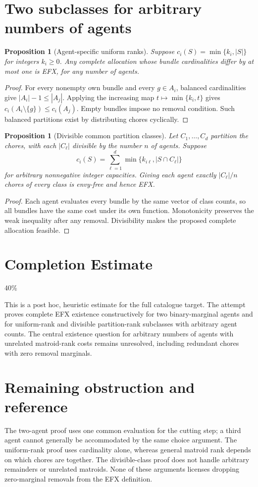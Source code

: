 \documentclass[11pt,a4paper]{article}
\newtheorem{proposition}[theorem]{Proposition}
\theoremstyle{definition}
\theoremstyle{remark}
\begin{document}
\section{Two subclasses for arbitrary numbers of agents}
\begin{proposition}[Agent-specific uniform ranks]
Suppose $c_i(S)=\min\{k_i,|S|\}$ for integers $k_i\geq0$. Any complete allocation whose bundle cardinalities differ by at most one is EFX, for any number of agents.
\end{proposition}
\begin{proof}
For every nonempty own bundle and every $g\in A_i$, balanced cardinalities give $|A_i|-1\leq|A_j|$. Applying the increasing map $t\mapsto\min\{k_i,t\}$ gives $c_i(A_i\setminus\{g\})\leq c_i(A_j)$. Empty bundles impose no removal condition. Such balanced partitions exist by distributing chores cyclically.
\end{proof}

\begin{proposition}[Divisible common partition classes]
Let $C_1,\ldots,C_d$ partition the chores, with each $|C_\ell|$ divisible by the number $n$ of agents. Suppose
\[
 c_i(S)=\sum_{\ell=1}^d\min\{k_{i\ell},|S\cap C_\ell|\}
\]
for arbitrary nonnegative integer capacities. Giving each agent exactly $|C_\ell|/n$ chores of every class is envy-free and hence EFX.
\end{proposition}
\begin{proof}
Each agent evaluates every bundle by the same vector of class counts, so all bundles have the same cost under its own function. Monotonicity preserves the weak inequality after any removal. Divisibility makes the proposed complete allocation feasible.
\end{proof}

\section{Completion Estimate}
40\%

This is a post hoc, heuristic estimate for the full catalogue target.
The attempt proves complete EFX existence constructively for two binary-marginal agents and for uniform-rank and divisible partition-rank subclasses with arbitrary agent counts. The central existence question for arbitrary numbers of agents with unrelated matroid-rank costs remains unresolved, including redundant chores with zero removal marginals.

\section{Remaining obstruction and reference}
The two-agent proof uses one common evaluation for the cutting step; a third agent cannot generally be accommodated by the same choice argument. The uniform-rank proof uses cardinality alone, whereas general matroid rank depends on which chores are together. The divisible-class proof does not handle arbitrary remainders or unrelated matroids. None of these arguments licenses dropping zero-marginal removals from the EFX definition.
\end{document}
